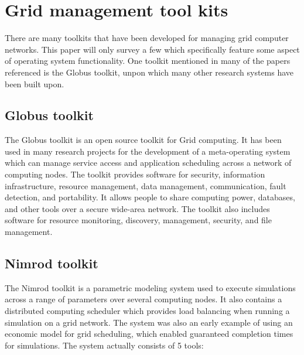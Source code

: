 \documentclass[conference]{IEEEtran}
\begin{document}
\section{\textbf{Grid management tool kits}}
There are many toolkits that have been developed for managing grid computer networks. This paper will only survey a few which specifically feature some aspect of operating system functionality. One toolkit mentioned in many of the papers referenced is the Globus toolkit, unpon which many other research systems have been built upon. 

\subsection{\textbf{Globus toolkit}}
The Globus toolkit is an open source toolkit for Grid computing. It has been used in many research projects for the development of a meta-operating system which can manage service access and application scheduling across a network of computing nodes. \cite{globus} The toolkit provides software for security, information infrastructure, resource management, data management, communication, fault detection, and portability. \cite{globustoolkit} It allows people to share computing power, databases, and other tools over a secure wide-area network. The toolkit also includes software for resource monitoring, discovery, management, security, and file management.  

\subsection{\textbf{Nimrod toolkit}}
The Nimrod toolkit is a parametric modeling system used to execute simulations across a range of parameters over several computing nodes. It also contains a distributed computing scheduler which provides load balancing when running a simulation on a grid network. \cite{nimrodweb} The system was also an early example of using an economic model for grid scheduling, which enabled guaranteed completion times for simulations. \cite{nimrod} The system actually consists of 5 tools:
\end{document}
